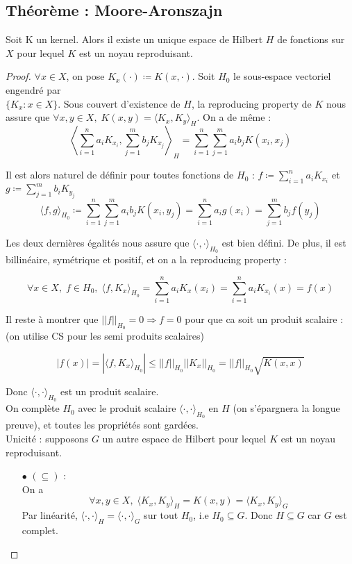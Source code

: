 \documentclass[a4paper, 11pt, french]{article}
\theoremstyle{definition}
\begin{document}
\subsection{Théorème : Moore-Aronszajn}

Soit K un kernel. Alors il existe un unique espace de Hilbert $H$ de fonctions sur $X$ pour lequel $K$ est un noyau reproduisant.

\begin{proof}
	$\forall x \in X$, on pose $K_x(\cdot) \coloneqq K(x, \cdot)$. Soit $H_0$ le sous-espace vectoriel engendré par \\ $\{K_x : x \in X\}$. Sous couvert d'existence de $H$, la reproducing property de $K$ nous assure que $\forall x, y \in X, \; K(x, y) = \langle K_x, K_y \rangle_H$. On a de même :
	\[\left\langle \sum_{i=1}^{n} a_i K_{x_i}, \sum_{j=1}^{m} b_j K_{x_j} \right\rangle_H = \sum_{i=1}^{n} \sum_{j=1}^{m} a_i b_j K(x_i, x_j)\]
	
	Il est alors naturel de définir pour toutes fonctions de $H_0$ : $f \coloneqq \sum_{i=1}^n a_i K_{x_i}$ et $g \coloneqq \sum_{j=1}^m b_i K_{y_j}$ 
	\[\langle f, g \rangle_{H_0} \coloneqq \sum_{i=1}^{n} \sum_{j=1}^{m} a_i b_j K(x_i, y_j) = \sum_{i=1}^n a_i g(x_i) = \sum_{j=1}^m b_j f(y_j)\]
	
	Les deux dernières égalités nous assure que $\langle \cdot, \cdot \rangle_{H_0}$ est bien défini. De plus, il est billinéaire, symétrique et positif, et on a la reproducing property :
	
	\[\forall x \in X, \; f \in H_0, \; \langle f, K_x \rangle_{H_0} = \sum_{i=1}^n a_i K_x(x_i) = \sum_{i=1}^n a_i K_{x_i}(x) = f(x)\]
	
	Il reste à montrer que $||f||_{H_0} = 0 \Rightarrow f = 0$ pour que ca soit un produit scalaire : (on utilise CS pour les semi produits scalaires)
	
	\[|f(x)| = |\langle f, K_x \rangle_{H_0}| \leq ||f||_{H_0} ||K_x||_{H_0} = ||f||_{H_0} \sqrt{K(x,x)} \]
	
	Donc $\langle \cdot, \cdot \rangle_{H_0}$ est un produit scalaire. \\
	
	On complète $H_0$ avec le produit scalaire $\langle \cdot, \cdot \rangle_{H_0}$ en $H$ (on s'épargnera la longue preuve), et toutes les propriétés sont gardées. \\
	
	Unicité : supposons $G$ un autre espace de Hilbert pour lequel $K$ est un noyau reproduisant. 
	\begin{itemize}
		\item[$\bullet$]
		$(\subseteq)$ : \\
		On a
		\[\forall x, y \in X, \; \langle K_x, K_y \rangle_H = K(x, y) = \langle K_x, K_y \rangle_G\]
		Par linéarité, $\langle \cdot, \cdot \rangle_H = \langle \cdot, \cdot \rangle_G$ sur tout $H_0$, i.e $H_0 \subseteq G$. Donc $H \subseteq G$ car $G$ est complet.
		

\end{itemize}
\end{proof}
\end{document}
